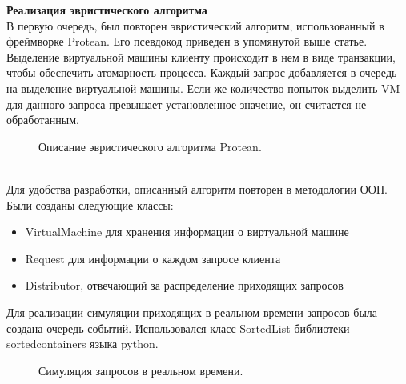 \documentclass{article}
\begin{document}
\textbf{Реализация эвристического алгоритма}\\
В первую очередь, был повторен эвристический алгоритм, использованный в фреймворке Protean. Его псевдокод приведен в упомянутой выше статье. Выделение виртуальной машины клиенту происходит в нем в виде транзакции, чтобы обеспечить атомарность процесса. Каждый запрос добавляется в очередь на выделение виртуальной машины. Если же количество попыток выделить VM для данного запроса превышает установленное значение, он считается не обработанным.\\
\begin{figure}[h]
\caption{Описание эвристического алгоритма Protean\cite{litlink21}.}
\label{ris:image}
\end{figure}\\
Для удобства разработки, описанный алгоритм повторен в методологии ООП. Были созданы следующие классы: 
\begin{itemize}
\item VirtualMachine для хранения информации о виртуальной машине
\item Request для информации о каждом запросе клиента
\item Distributor, отвечающий за распределение приходящих запросов
\end{itemize}
Для реализации симуляции приходящих в реальном времени запросов была создана очередь событий. Использовался класс SortedList библиотеки sortedcontainers языка python. 
\begin{figure}[h!]
\caption{Симуляция запросов в реальном времени.}
\label{ris:image}
\end{figure}\\
\end{document}
